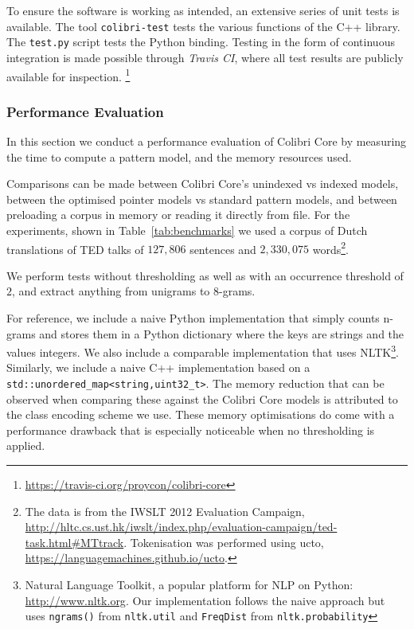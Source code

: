 \documentclass[a4paper,12pt]{article}
\begin{document}
To ensure the software is working as intended, an extensive series of unit
tests is available.  The tool \texttt{colibri-test} tests the various functions
of the C++ library. The \texttt{test.py} script tests the Python binding.
Testing in the form of continuous integration is made possible through
\emph{Travis CI}, where all test results are publicly available for inspection.
\footnote{\url{https://travis-ci.org/proycon/colibri-core}}

\subsubsection{Performance Evaluation}

In this section we conduct a performance evaluation of Colibri Core by
measuring the time to compute a pattern model, and the memory resources used.

Comparisons can be made between Colibri Core's
unindexed vs indexed models, between the optimised pointer models vs
standard pattern models, and between preloading a corpus in memory or reading
it directly from file.  For the experiments, shown in
Table~\ref{tab:benchmarks} we used a corpus of Dutch
translations of TED talks of $127,806$ sentences and $2,330,075$
words\footnote{The data is from the IWSLT 2012 Evaluation Campaign,
    \url{http://hltc.cs.ust.hk/iwslt/index.php/evaluation-campaign/ted-task.html\#MTtrack}.
Tokenisation was performed using ucto,
\url{https://languagemachines.github.io/ucto}.}. 

We perform tests without thresholding as well as with an occurrence threshold
of $2$, and extract anything from unigrams to $8$-grams. 

For reference, we include a naive Python implementation that simply counts
n-grams and stores them in a Python dictionary where the keys are strings and
the values integers. We also include a comparable implementation that uses
NLTK\footnote{Natural Language Toolkit, a popular platform for NLP on Python:
    \url{http://www.nltk.org}. Our implementation follows the naive approach
    but uses \texttt{ngrams()} from \texttt{nltk.util} and \texttt{FreqDist} from
\texttt{nltk.probability}}. Similarly, we include a naive C++ implementation based on
a \verb|std::unordered_map<string,uint32_t>|. The memory reduction that can be
observed when comparing these against the Colibri Core models is attributed to
the class encoding scheme we use. These memory optimisations do come with a
performance drawback that is especially noticeable when no thresholding is
applied.
\end{document}
